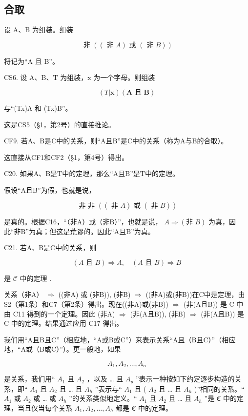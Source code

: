\subsection{合取}

设 A、B 为组装。组装

\[
\text { 非 } ((\text { 非 } A) \text { 或 } (\text { 非 } B))
\]

将记为“A 且 B”。

CS6. 设 A、B、T 为组装，x 为一个字母。则组装

\[
(T | \boldsymbol {x}) (\boldsymbol {A} \text { 且 } \boldsymbol {B})
\]

与“(T\textbar x)A 和 (T\textbar x)B''。

这是CS5（§1，第2号）的直接推论。

CF9. 若A、B是C中的关系，则“A且B”是C中的关系（称为A与B的合取）。

这直接从CF1和CF2（§1，第4号）得出。

C20. 如果A、B是T中的定理，那么“A且B”是T中的定理。

假设“A且B”为假，也就是说，

\[
\text { 非   非   } ((\text { 非   } A) \text {   或   } (\text { 非   } B))
\]

是真的。根据C16，“（非A）或（非B）”，也就是说， \(A \Longrightarrow (\text{非 } B)\) 为真，因此“非B”为真；但这是荒谬的。因此“A且B”为真。

C21. 若A、B是C中的关系，则

\[
(A \text {   且   } B) \Longrightarrow A, \quad (A \text {   且   } B) \Longrightarrow B
\]

是 \(\mathcal{C}\) 中的定理 .

关系（非A） \(\Longrightarrow\) ((非A) 或 (非B)), (非B) \(\Longrightarrow\) ((非A)或(非B))在C中是定理，由S2（第1条）和C7（第2条）得出。现在((非A)或(非B)) \(\Longrightarrow\) (非(A且B)) 是 C 中由 C11 得到的一个定理。因此 (非A) \(\Longrightarrow\) (非(A且B)), (非B) \(\Longrightarrow\) (非(A且B)) 是 C 中的定理。结果通过应用 C17 得出。

我们用“A且B且C”（相应地，“A或B或C”）来表示关系“A且（B且C）”（相应地，“A或（B或C）”）。更一般地，如果

\[
A _ {1}, A _ {2}, \dots , A _ {n}
\]

是关系，我们用`` \(A_{1}\) 且 \(A_{2}\) ，以及 \ldots{} 且 \(A_{p}\) ''表示一种按如下约定逐步构造的关系，即`` \(A_{1}\) 且 \(A_{2}\) 且 \ldots{} 且 \(A_{h}\) ''表示与`` \(A_{1}\) 且 ( \(A_{2}\) 且 \ldots{} 且 \(A_{h}\) )''相同的关系。`` \(A_{1}\) 或 \(A_{2}\) 或 \ldots{} 或 \(A_{h}\) ''的关系类似地定义。`` \(A_{1}\) 且 \(A_{2}\) 且 \ldots{} 且 \(A_{h}\) ''是 \(\mathfrak{C}\) 中的定理，当且仅当每个关系 \(A_{1}, A_{2}, \ldots, A_{h}\) 都是 \(\mathfrak{C}\) 中的定理。

